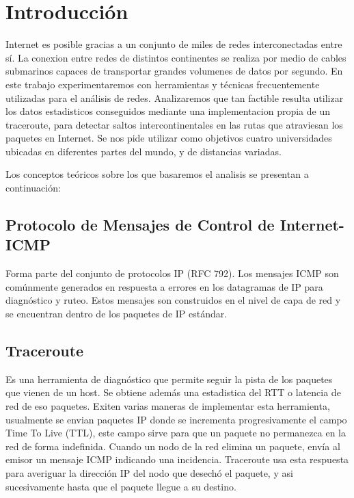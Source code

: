 \section{Introducción}

Internet es posible gracias a un conjunto de miles de redes interconectadas entre sí.
La conexion entre redes de distintos continentes se realiza por medio de cables submarinos capaces de transportar grandes volumenes de datos por segundo.
En este trabajo experimentaremos con herramientas y técnicas frecuentemente utilizadas para el análisis de redes.
Analizaremos que tan factible resulta utilizar los datos estadisticos conseguidos mediante una implementacion propia de un traceroute, para detectar saltos intercontinentales en las rutas que atraviesan los paquetes en Internet.  
Se nos pide utilizar como objetivos cuatro universidades ubicadas en diferentes partes del mundo, y de distancias variadas.

Los conceptos teóricos sobre los que basaremos el analisis se presentan a continuación: 

\subsection{Protocolo de Mensajes de Control de Internet- ICMP}

Forma parte del conjunto de protocolos IP (RFC 792). Los mensajes ICMP son comúnmente generados en respuesta a errores en los datagramas de IP para diagnóstico y ruteo. Estos mensajes son construidos en el nivel de capa de red y se encuentran dentro de los paquetes de IP estándar.

\subsection{Traceroute}

Es una herramienta de diagnóstico que permite seguir la pista de los paquetes que vienen de un host. Se obtiene además una estadistica del RTT o latencia de red de eso paquetes.
Exiten varias maneras de implementar esta herramienta, usualmente se envian paquetes IP donde se incrementa progresivamente el campo Time To Live (TTL), este campo sirve para que un paquete no permanezca en la red de forma indefinida. Cuando un nodo de la red elimina un paquete, envía al emisor un mensaje ICMP indicando una incidencia. Traceroute usa esta respuesta para averiguar la dirección IP del nodo que desechó el paquete, y asi sucesivamente hasta que el paquete llegue a su destino.

